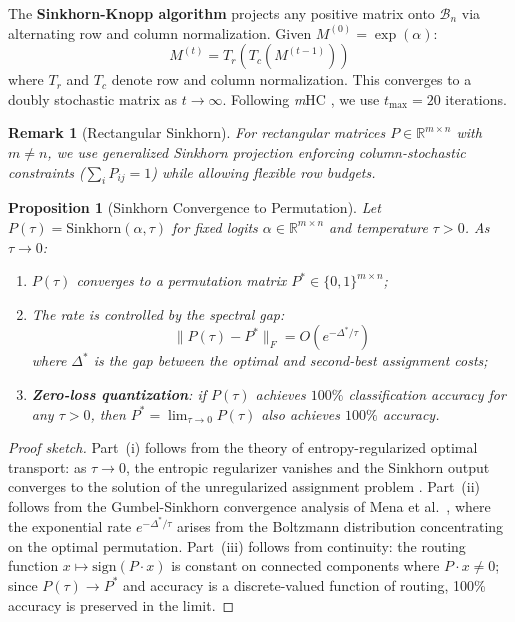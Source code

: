 \documentclass[Royal,times,sageh]{sagej}
\newcommand{\sign}{\text{sign}}
\newcommand{\mHC}{\textit{m}HC}
\newtheorem{proposition}{Proposition}
\newtheorem{remark}{Remark}
\begin{document}
The \textbf{Sinkhorn-Knopp algorithm} \cite{sinkhorn1967concerning} projects any positive matrix onto $\mathcal{B}_n$ via alternating row and column normalization. Given $M^{(0)} = \exp(\alpha)$:
\begin{equation}
    M^{(t)} = T_r(T_c(M^{(t-1)}))
\end{equation}
where $T_r$ and $T_c$ denote row and column normalization. This converges to a doubly stochastic matrix as $t \to \infty$. Following \mHC{} \cite{xie2024mhc}, we use $t_{\max} = 20$ iterations.

\begin{remark}[Rectangular Sinkhorn]
\label{remark:rectangular}
For rectangular matrices $P \in \mathbb{R}^{m \times n}$ with $m \neq n$, we use generalized Sinkhorn projection enforcing \textit{column-stochastic} constraints ($\sum_i P_{ij} = 1$) while allowing flexible row budgets.
\end{remark}

\begin{proposition}[Sinkhorn Convergence to Permutation]
\label{prop:sinkhorn_convergence}
Let $P(\tau) = \mathrm{Sinkhorn}(\alpha, \tau)$ for fixed logits $\alpha \in \mathbb{R}^{m \times n}$ and temperature $\tau > 0$. As $\tau \to 0$:
\begin{enumerate}
\renewcommand{\labelenumi}{(\roman{enumi})}
    \item $P(\tau)$ converges to a permutation matrix $P^* \in \{0,1\}^{m \times n}$;
    \item The rate is controlled by the spectral gap:
    \begin{equation}
        \|P(\tau) - P^*\|_F = O\!\left(e^{-\Delta^* / \tau}\right)
    \end{equation}
    where $\Delta^*$ is the gap between the optimal and second-best assignment costs;
    \item \textbf{Zero-loss quantization}: if $P(\tau)$ achieves $100\%$ classification accuracy for any $\tau > 0$, then $P^* = \lim_{\tau \to 0} P(\tau)$ also achieves $100\%$ accuracy.
\end{enumerate}
\end{proposition}

\begin{proof}[Proof sketch]
Part~(i) follows from the theory of entropy-regularized optimal transport: as $\tau \to 0$, the entropic regularizer vanishes and the Sinkhorn output converges to the solution of the unregularized assignment problem \cite{cuturi2013sinkhorn}. Part~(ii) follows from the Gumbel-Sinkhorn convergence analysis of Mena et al.~\cite{mena2018learning}, where the exponential rate $e^{-\Delta^*/\tau}$ arises from the Boltzmann distribution concentrating on the optimal permutation. Part~(iii) follows from continuity: the routing function $x \mapsto \sign(P \cdot x)$ is constant on connected components where $P \cdot x \neq 0$; since $P(\tau) \to P^*$ and accuracy is a discrete-valued function of routing, 100\% accuracy is preserved in the limit.
\end{proof}
\end{document}
